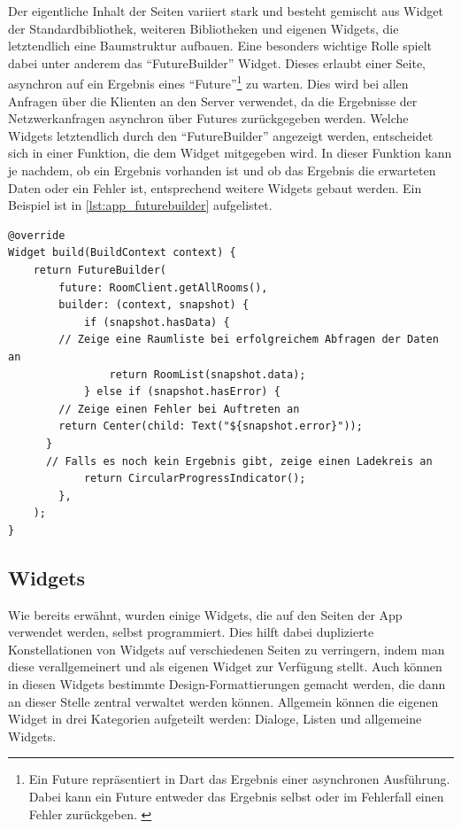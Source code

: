 Der eigentliche Inhalt der Seiten variiert stark und besteht gemischt aus Widget der Standardbibliothek, weiteren Bibliotheken
und eigenen Widgets, die letztendlich eine Baumstruktur aufbauen.
Eine besonders wichtige Rolle spielt dabei unter anderem das \enquote{FutureBuilder} Widget.
Dieses erlaubt einer Seite, asynchron auf ein Ergebnis eines \enquote{Future}\footnote{Ein Future repräsentiert in Dart das Ergebnis
einer asynchronen Ausführung. Dabei kann ein Future entweder das Ergebnis selbst oder im Fehlerfall einen Fehler zurückgeben. \cite{dart2020}}
 zu warten.
Dies wird bei allen Anfragen über die Klienten an den Server verwendet, da die Ergebnisse der Netzwerkanfragen asynchron
über Futures zurückgegeben werden.
Welche Widgets letztendlich durch den \enquote{FutureBuilder} angezeigt werden, entscheidet sich in einer Funktion,
die dem Widget mitgegeben wird.
In dieser Funktion kann je nachdem, ob ein Ergebnis vorhanden ist und ob das Ergebnis die erwarteten Daten oder
ein Fehler ist, entsprechend weitere Widgets gebaut werden.
Ein Beispiel ist in \autoref{lst:app_futurebuilder} aufgelistet.

\begin{lstlisting}[caption={Beispiel für die Verwendung des \enquote{FutureBuilder}},label={lst:app_futurebuilder},tabsize=2]
@override
Widget build(BuildContext context) {
	return FutureBuilder(
		future: RoomClient.getAllRooms(),
		builder: (context, snapshot) {
			if (snapshot.hasData) {
        // Zeige eine Raumliste bei erfolgreichem Abfragen der Daten an
				return RoomList(snapshot.data);
			} else if (snapshot.hasError) {
        // Zeige einen Fehler bei Auftreten an
        return Center(child: Text("${snapshot.error}"));
      }
      // Falls es noch kein Ergebnis gibt, zeige einen Ladekreis an
			return CircularProgressIndicator();
		},
	);
}
\end{lstlisting}

\FloatBarrier
\subsection{Widgets}

Wie bereits erwähnt, wurden einige Widgets, die auf den Seiten der App verwendet werden, selbst programmiert.
Dies hilft dabei duplizierte Konstellationen von Widgets auf verschiedenen Seiten zu verringern, indem man diese
verallgemeinert und als eigenen Widget zur Verfügung stellt.
Auch können in diesen Widgets bestimmte Design-Formattierungen gemacht werden, die dann an dieser Stelle zentral verwaltet
werden können.
Allgemein können die eigenen Widget in drei Kategorien aufgeteilt werden:
Dialoge, Listen und allgemeine Widgets.

